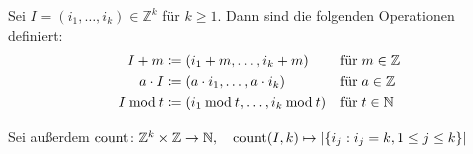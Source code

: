 \begin{definition}
    Sei $I = (i_1,\dots,i_k) \in \mathbb{Z}^k$ für $k \geq 1$. Dann sind die folgenden Operationen definiert:
    \begin{align*}
        I + m       &\coloneq (i_1 +m, \dots, i_k +m)               && \text{für} \; m \in \mathbb{Z} \\
        a \cdot I   &\coloneq (a \cdot i_1 , \dots, a \cdot i_k)    && \text{für} \; a \in \mathbb{Z} \\
        I \mathbin\mathrm{mod} t &\coloneq (i_1 \mathbin\mathrm{mod} t, \dots, i_k \mathbin\mathrm{mod} t) && \text{für} \; t \in \mathbb{N} 
    \end{align*}

    Sei außerdem $\mathrm{count} \colon \mathbb{Z}^k \times \mathbb{Z} \to \mathbb{N}, \quad \mathrm{count}(I, k) \mapsto |\{i_j: i_j = k, 1\leq j\leq k\}|$
\end{definition}